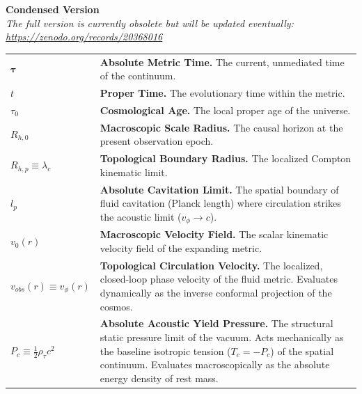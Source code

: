\documentclass[11pt, a4paper]{article}
\begin{document}
\vspace{4cm}


\begin{center}
    \LARGE\textbf{Condensed Version}\\ 
    \vspace{1cm}
    \small\textit{The full version is currently obsolete but will be updated eventually:  \\ \hyperlink{https://zenodo.org/records/20368016}{https://zenodo.org/records/20368016}}
\end{center}



\begin{tcolorbox}[colback=white, colframe=academiabrown!90!black, arc=1mm, boxrule=0.8pt, title={\textbf{TABLE 1: KINEMATIC NOMENCLATURE \& METRIC CONSTANTS}}]
\renewcommand{\arraystretch}{1.4}
\begin{tabular}{p{} p{}}
    $\boldsymbol{\tau}$ & \textbf{Absolute Metric Time.} The current, unmediated time of the continuum. \\
    $t$ & \textbf{Proper Time.} The evolutionary time within the metric. \\
    $\tau_0$ & \textbf{Cosmological Age.} The local proper age of the universe. \\
    $R_{h,0}$ & \textbf{Macroscopic Scale Radius.} The causal horizon at the present observation epoch. \\
    $R_{h,p} \equiv \lambda_c$ & \textbf{Topological Boundary Radius.} The localized Compton kinematic limit. \\
    $l_p$ & \textbf{Absolute Cavitation Limit.} The spatial boundary of fluid cavitation (Planck length) where circulation strikes the acoustic limit ($v_\phi \to c$). \\
    $v_0(r)$ & \textbf{Macroscopic Velocity Field.} The scalar kinematic velocity field of the expanding metric. \\
    $v_{obs}(r) \equiv v_\phi(r)$ & \textbf{Topological Circulation Velocity.} The localized, closed-loop phase velocity of the fluid metric. Evaluates dynamically as the inverse conformal projection of the cosmos. \\
   $P_c \equiv \frac{1}{2}\rho_{\tau}c^2$ & \textbf{Absolute Acoustic Yield Pressure.} The structural static pressure limit of the vacuum. Acts mechanically as the baseline isotropic tension ($T_c = -P_c$) of the spatial continuum. Evaluates macroscopically as the absolute energy density of rest mass. \\

\end{tabular}
\end{tcolorbox}
\end{document}
